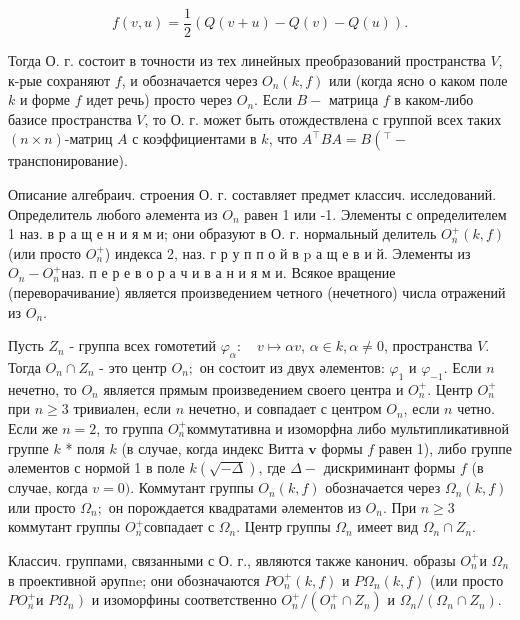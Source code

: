 \documentclass[10pt]{article}
\begin{document}
\[

f(v, u)=\frac{1}{2}(Q(v+u)-Q(v)-Q(u)) .

\]



Тогда О. г. состоит в точности из тех линейных преобразований пространства $V$, к-рые сохраняют $f$, и обозначается через $O_{n}(k, f)$ или (когда ясно о каком поле $k$ и форме $f$ идет речь) просто через $O_{n}$. Если $B-$ матрица $f$ в каком-либо базисе пространства $V$, то О. г. может быть отождествлена с группой всех таких $(n \times n)$-матриц $A$ с коэффициентами в $k$, что $A^{\top} B A=B\left({ }^{\top}-\right.$ транспонирование).



Описание алгебраич. строения О. г. составляет предмет классич. исследований. Определитель любого әлемента из $O_{n}$ равен 1 или -1. Элементы с определителем 1 наз. в р а щ е н и я м и; они образуют в О. г. нормальный делитель $O_{n}^{+}(k, f)$ (или просто $O_{n}^{+}$) индекса 2, наз. г р у п п о й в $\mathrm{p}$ а щ е в и й. Элементы из $O_{n}-O_{n}^{+}$наз. п е р е в о р а ч и в а н и я м и. Всякое вращение (переворачивание) является произведением четного (нечетного) числа отражений из $O_{n}$.



Пусть $Z_{n}$ - группа всех гомотетий $\varphi_{\alpha}: \quad v \mapsto \alpha v$, $\alpha \in k, \alpha \neq 0$, пространства $V$. Тогда $O_{n} \cap Z_{n}$ - это центр $O_{n} ;$ он состоит из двух әлементов: $\varphi_{1}$ и $\varphi_{-1}$. Если $n$ нечетно, то $O_{n}$ является прямым произведением своего центра и $O_{n}^{+}$. Центр $O_{n}^{+}$при $n \geqslant 3$ тривиален, если $n$ нечетно, и совпадает с центром $O_{n}$, если $n$ четно. Если же $n=2$, то группа $O_{n}^{+}$коммутативна и изоморфна либо мультипликативной группе $k$ * поля $k$ (в случае, когда индекс Витта $\boldsymbol{v}$ формы $f$ равен 1), либо группе әлементов с нормой 1 в поле $k(\sqrt{-\Delta})$, где $\Delta-$ дискриминант формы $f$ (в случае, когда $v=0)$. Коммутант группы $O_{n}(k, f)$ обозначается через $\Omega_{n}(k, f)$ или просто $\Omega_{n} ;$ он порождается квадратами әлементов из $O_{n}$. При $n \geqslant 3$ коммутант группы $O_{n}^{+}$совпадает с $\Omega_{n}$. Центр группы $\Omega_{n}$ имеет вид $\Omega_{n} \cap Z_{n}$.



Классич. группами, связанными с О. г., являются также канонич. образы $O_{n}^{+}$и $\Omega_{n}$ в проективной әрупne; они обозначаются $P O_{n}^{+}(k, f)$ и $P \Omega_{n}(k, f)$ (или просто $P O_{n}^{+}$и $\left.P \Omega_{n}\right)$ и изоморфины соответственно $O_{n}^{+} /\left(O_{n}^{+} \cap Z_{n}\right)$ и $\Omega_{n} /\left(\Omega_{n} \cap Z_{n}\right)$.
\end{document}
